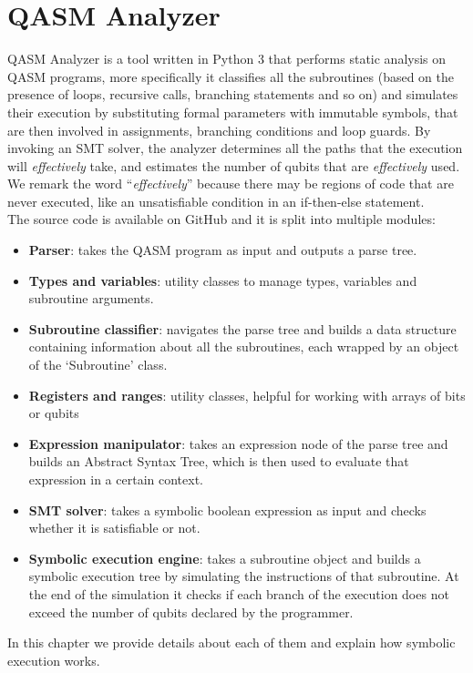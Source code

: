 \documentclass[12pt,a4paper]{report}
\theoremstyle{definition}
\theoremstyle{definition}
\theoremstyle{definition}
\begin{document}
\chapter{QASM Analyzer}
QASM Analyzer is a tool written in Python 3 that performs static analysis on QASM programs, more specifically it classifies all the subroutines (based on the presence of loops, recursive calls, branching statements and so on) and simulates their execution by substituting formal parameters with immutable symbols, that are then involved in assignments, branching conditions and loop guards. By invoking an SMT solver, the analyzer determines all the paths that the execution will \textit{effectively} take, and estimates the number of qubits that are \textit{effectively} used. We remark the word ``\textit{effectively}'' because there may be regions of code that are never executed, like an unsatisfiable condition in an if-then-else statement.\\
The source code is available on GitHub \cite{lusvelt} and it is split into multiple modules:
\begin{itemize}
    \itemsep 0em
    \item \textbf{Parser}: takes the QASM program as input and outputs a parse tree.
    \item \textbf{Types and variables}: utility classes to manage types, variables and subroutine arguments.
    \item \textbf{Subroutine classifier}: navigates the parse tree and builds a data structure containing information about all the subroutines, each wrapped by an object of the `Subroutine' class.
    \item \textbf{Registers and ranges}: utility classes, helpful for working with arrays of bits or qubits
    \item \textbf{Expression manipulator}: takes an expression node of the parse tree and builds an Abstract Syntax Tree, which is then used to evaluate that expression in a certain context.
    \item \textbf{SMT solver}: takes a symbolic boolean expression as input and checks whether it is satisfiable or not.
    \item \textbf{Symbolic execution engine}: takes a subroutine object and builds a symbolic execution tree by simulating the instructions of that subroutine. At the end of the simulation it checks if each branch of the execution does not exceed the number of qubits declared by the programmer.
\end{itemize}
In this chapter we provide details about each of them and explain how symbolic execution works.
\end{document}
